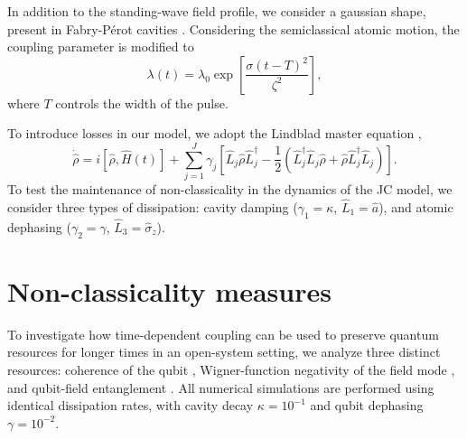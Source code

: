 \documentclass[aps,pre,superscriptaddress,twocolumn,10pt]{revtex4-2}
\begin{document}
 In addition to the standing-wave field profile, we consider a gaussian shape, present in Fabry-Pérot cavities \cite{Brune1996,VidiellaBarranco2025}.
 Considering the semiclassical atomic motion, the coupling parameter is modified to
 \begin{equation} \label{eq:gaussian_coup}
     \lambda(t)=\lambda_0\exp\left[\frac{\sigma(t-T)^2}{\zeta^2}\right],
 \end{equation}
 where $T$ controls the width of the pulse.
 

 To introduce losses in our model, we adopt the Lindblad master equation \cite{Lindblad1976,Breuer2007,Manzano2020}, 
 \begin{equation}
     \dot{\hat{\rho}}=i\left[\hat{\rho},\hat{H}(t)\right]+\sum_{j=1}^J \gamma_j \left[ {\hat{L}_j}\hat{\rho}{\hat{L}^\dagger_j} - \frac{1}{2} \left({\hat{L}^\dagger_j} {\hat{L}_j} \hat{\rho} + \hat{\rho}{\hat{L}^\dagger_j} {\hat{L}_j} \right) \right].
 \end{equation}
 To test the maintenance of non-classicality in the dynamics of the JC model, we consider three types of dissipation: cavity damping ($\gamma_1=\kappa$, $\hat{L}_1=\hat{a}$),
 and atomic dephasing ($\gamma_2=\gamma$, $\hat{L}_3=\hat{\sigma}_z$).

\section{Non-classicality measures}
\label{sec:fock_non-classicality_jc_model}
To investigate how time-dependent coupling can be used to preserve quantum resources for longer times in an open-system setting, we analyze three distinct resources: coherence of the qubit \cite{Streltsov2017}, Wigner-function negativity of the field mode \cite{Wigner1932,GERRY2005}, and qubit-field entanglement \cite{Horodecki2009}.
All numerical simulations are performed using identical dissipation rates, with cavity decay $\kappa=10^{-1}$ and qubit dephasing $\gamma=10^{-2}$.
\end{document}
